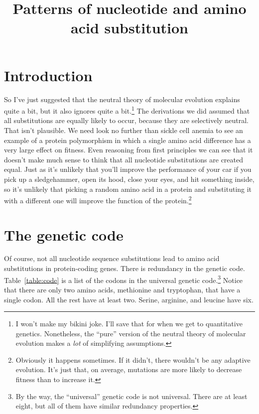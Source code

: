\documentclass[12pt]{article}
\title{Patterns of nucleotide and amino acid substitution}
\begin{document}
\maketitle

\thispagestyle{first}

\section*{Introduction}

So I've just suggested that the neutral theory of molecular evolution
explains quite a bit, but it also ignores quite a bit.\footnote{I
  won't make my bikini joke. I'll save that for when we get to
  quantitative genetics. Nonetheless, the ``pure'' version of the
  neutral theory of molecular evolution makes a {\it lot\/} of
  simplifying assumptions.} The derivations we did assumed that all
substitutions are equally likely to occur, because they are
selectively neutral. That isn't plausible. We need look no further
than sickle cell anemia to see an example of a protein polymorphism in
which a single amino acid difference has a very large effect on
fitness. Even reasoning from first principles we can see that it
doesn't make much sense to think that all nucleotide substitutions are
created equal. Just as it's unlikely that you'll improve the
performance of your car if you pick up a sledgehammer, open its hood,
close your eyes, and hit something inside, so it's unlikely that
picking a random amino acid in a protein and substituting it with a
different one will improve the function of the
protein.\footnote{Obviously it happens sometimes. If it didn't, there
  wouldn't be any adaptive evolution. It's just that, on average,
  mutations are more likely to decrease fitness than to increase
  it. }

\section*{The genetic code}

Of course, not all nucleotide sequence substitutions lead to amino
acid substitutions in protein-coding genes. There is redundancy in the
genetic code. Table~\ref{table:code} is a list of the codons in the
universal genetic code.\footnote{By the way, the ``universal'' genetic
  code is not universal. There are at least eight, but all of them
  have similar redundancy properties.} Notice that there are only two
amino acids, methionine and tryptophan, that have a single codon. All the
rest have at least two. Serine, arginine, and leucine have
six.
\end{document}
